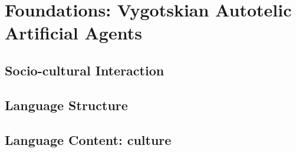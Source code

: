 \chapter{Foundations: Vygotskian Autotelic Artificial Agents}

\section{Socio-cultural Interaction}
\section{Language Structure}
\section{Language Content: culture}